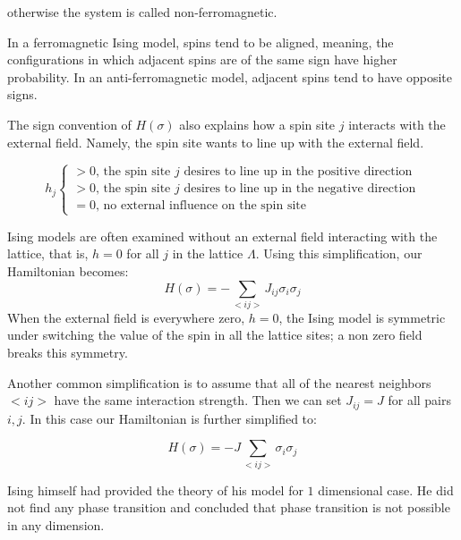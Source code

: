 	otherwise the system is called non-ferromagnetic.
	
	In a ferromagnetic Ising model, spins tend to be aligned, meaning, the configurations in which adjacent spins are of the same sign have higher probability. In an anti-ferromagnetic model, adjacent spins tend to have opposite signs.
	
	The sign convention of $H(\sigma)$ also explains how a spin site $j$ interacts with the external field. Namely, the spin site wants to line up with the external field.
	
	\begin{equation}
	h_j
	\begin{cases}
		 > 0 \text{,  the spin site $j$ desires to line up in the positive direction} \\
		 > 0 \text{,  the spin site $j$ desires to line up in the negative direction} \\
		 = 0 \text{,  no external influence on the spin site}
	\end{cases}
	\end{equation}



	Ising models are often examined without an external field interacting with the lattice, that is, $h = 0$ for all $j$ in the lattice $\Lambda$. Using this simplification, our Hamiltonian becomes:
	\begin{equation}
		H(\sigma) = - \sum_{<i j>} J_{i j} \sigma_i \sigma_j
	\end{equation}
	When the external field is everywhere zero, $h = 0$, the Ising model is symmetric under switching the value of the spin in all the lattice sites; a non zero field breaks this symmetry.
	
	Another common simplification is to assume that all of the nearest neighbors $<ij>$ have the same interaction strength. Then we can set $J_{ij} = J$ for all pairs $i,j$. In this case our Hamiltonian is further simplified to:
	
	\begin{equation}
		H(\sigma) = - J \sum_{<i j>} \sigma_i \sigma_j
	\end{equation}
	
	Ising himself had provided the theory of his model for $1$ dimensional case. He did not find any phase transition and concluded that phase transition is not possible in any dimension. 
	
